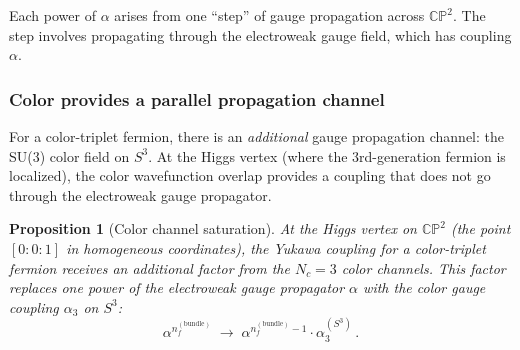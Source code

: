 \documentclass[11pt,a4paper]{article}
\newcommand{\CP}{\mathbb{CP}}
\newtheorem{proposition}[theorem]{Proposition}
\theoremstyle{definition}
\theoremstyle{remark}
\begin{document}
Each power of $\alpha$ arises from one ``step'' of gauge propagation
across $\CP^2$.  The step involves propagating through the electroweak
gauge field, which has coupling $\alpha$.

\subsubsection{Color provides a parallel propagation channel}

For a color-triplet fermion, there is an \emph{additional} gauge
propagation channel: the SU(3) color field on $S^3$.  At the Higgs
vertex (where the 3rd-generation fermion is localized), the color
wavefunction overlap provides a coupling that does not go through
the electroweak gauge propagator.

\begin{proposition}[Color channel saturation]
\label{prop:saturation}
At the Higgs vertex on $\CP^2$ (the point $[0:0:1]$ in homogeneous
coordinates), the Yukawa coupling for a color-triplet fermion receives
an additional factor from the $N_c = 3$ color channels.  This factor
replaces one power of the electroweak gauge propagator $\alpha$ with
the color gauge coupling $\alpha_3$ on $S^3$:
\begin{equation}\label{eq:replacement}
\alpha^{n_f^{(\text{bundle})}} \;\longrightarrow\;
\alpha^{n_f^{(\text{bundle})} - 1} \cdot \alpha_3^{(S^3)}\,.
\end{equation}
\end{proposition}
\end{document}
